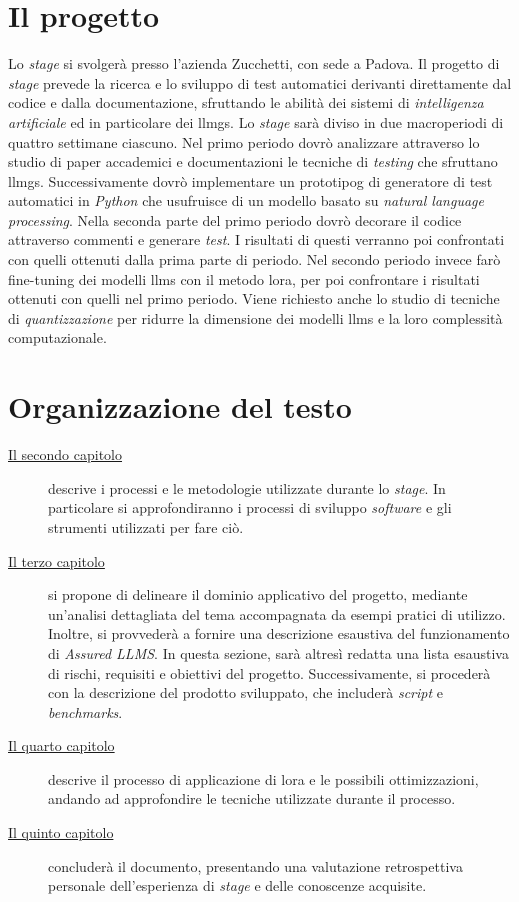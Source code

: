 \section{Il progetto}
Lo \textit{stage} si svolgerà presso l'azienda Zucchetti, con sede a Padova. Il progetto di \textit{stage} prevede la ricerca e lo sviluppo di test automatici derivanti direttamente dal codice e dalla documentazione, sfruttando le abilità dei sistemi di \textit{intelligenza artificiale} ed in particolare dei \glspl{llmg}.
Lo \textit{stage} sarà diviso in due macroperiodi di quattro settimane ciascuno. Nel primo periodo dovrò analizzare attraverso lo studio di paper accademici e documentazioni le tecniche di \textit{testing} che sfruttano \glspl{llmg}. Successivamente dovrò implementare un \gls{prototipog} di generatore di test automatici in \textit{Python} che usufruisce di un modello basato su \textit{natural language processing}. Nella seconda parte del primo periodo dovrò decorare il codice attraverso commenti e generare \textit{test}. I risultati di questi verranno poi confrontati con quelli ottenuti dalla prima parte di periodo. Nel secondo periodo invece farò \gls{fine-tuning} dei modelli \glspl{llm} con il metodo \gls{lora}, per poi confrontare i risultati ottenuti con quelli nel primo periodo.
Viene richiesto anche lo studio di tecniche di \textit{quantizzazione} per ridurre la dimensione dei modelli \glspl{llm} e la loro complessità computazionale.
\section{Organizzazione del testo}
\begin{description}
    \item[{\hyperref[chap:processi-metodologie]{Il secondo capitolo}}] descrive i processi e le metodologie utilizzate durante lo \textit{stage}. In particolare si approfondiranno i processi di sviluppo \textit{software} e gli strumenti utilizzati per fare ciò.
    
    \item[{\hyperref[chap:descrizione-stage-1]{Il terzo capitolo}}] si propone di delineare il dominio applicativo del progetto, mediante un'analisi dettagliata del tema accompagnata da esempi pratici di utilizzo. 
    Inoltre, si provvederà a fornire una descrizione esaustiva del funzionamento di \textit{Assured LLMS}. 
    In questa sezione, sarà altresì redatta una lista esaustiva di rischi, requisiti e obiettivi del progetto. 
    Successivamente, si procederà con la descrizione del prodotto sviluppato, che includerà \textit{script} e \textit{benchmarks}. 

    \item[{\hyperref[chap:descrizione-stage-2]{Il quarto capitolo}}] descrive il processo di applicazione di \gls{lora} e le possibili ottimizzazioni, andando ad approfondire le tecniche utilizzate durante il processo.

    \item[{\hyperref[chap:conclusioni]{Il quinto capitolo}}] concluderà il documento, presentando una valutazione retrospettiva personale dell'esperienza di \textit{stage} e delle conoscenze acquisite.
    
\end{description}

